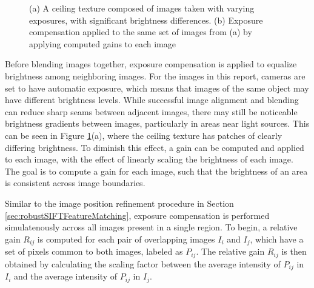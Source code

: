 \documentclass[]{spie}  %
\begin{document}
\begin{figure}
  \centering
  \caption{(a) A ceiling texture composed of images taken with varying
    exposures, with significant brightness differences. (b) Exposure
    compensation applied to the same set of images from (a) by
    applying computed gains to each image}
  \label{fig:exposureDiff}
\end{figure}


Before blending images together, exposure compensation is applied to
equalize brightness among neighboring images. For the images in this
report, cameras are set to have automatic exposure, which means that
images of the same object may have different brightness levels. While
successful image alignment and blending can reduce sharp seams between
adjacent images, there may still be noticeable brightness gradients
between images, particularly in areas near light sources. This can be
seen in Figure \ref{fig:exposureDiff}(a), where the ceiling texture
has patches of clearly differing brightness. To diminish this effect,
a gain can be computed and applied to each image, with the effect of
linearly scaling the brightness of each image. The goal is to compute
a gain for each image, such that the brightness of an area is
consistent across image boundaries.

Similar to the image position refinement procedure in Section
\ref{sec:robustSIFTFeatureMatching}, exposure compensation is
performed simulatenously across all images present in a single
region. To begin, a relative gain $R_{ij}$ is computed for each pair
of overlapping images $I_i$ and $I_j$, which have a set of pixels
common to both images, labeled as $P_{ij}$. The relative gain $R_{ij}$
is then obtained by calculating the scaling factor between the average
intensity of $P_{ij}$ in $I_i$ and the average intensity of $P_{ij}$
in $I_j$.
\end{document}
